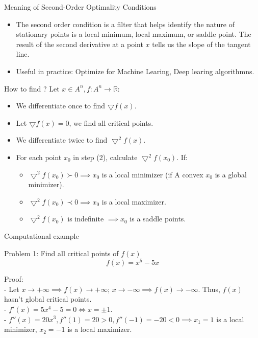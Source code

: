     \begin{frame}{Meaning of Second-Order Optimality Conditions}
    \begin{itemize}
        \item The second order condition is a filter that helps identify the nature of stationary points is a local minimum, local maximum, or saddle point. The result of the second derivative at a point $x$ tells us the slope of the tangent line.
        \item Useful in practice: Optimize for Machine Learing, Deep learing algorithmns.
    \end{itemize}
    \end{frame}

    \begin{frame}{How to find ?}
        Let $x \in A^n, f: A^n \rightarrow \mathbb{R}$:
        \begin{itemize}
            \item We differentiate once to find $\bigtriangledown f(x)$.
            \item Let $\bigtriangledown f(x) = 0$, we find all critical points.
            \item  We differentiate twice to find $\bigtriangledown ^2 f(x)$.
            \item For each point $x_0$ in step (2), calculate $\bigtriangledown ^2 f(x_0)$. If:
            \begin{itemize}
                \item $\bigtriangledown ^2 f(x_0) \succ 0 \implies x_0$ is a local minimizer (if A convex $x_0$ is a global minimizer).
                \item $\bigtriangledown ^2 f(x_0) \prec 0 \implies x_0$ is a local maximizer.
                \item $\bigtriangledown ^2 f(x_0)$ is indefinite $\implies x_0$ is a saddle points.
            \end{itemize}
        \end{itemize}
    \end{frame}

    \begin{frame}{Computational example}
        \begin{block}{Problem 1: Find all critical points of $f(x)$}
            \begin{equation}
                f(x) = x^5 - 5x
            \end{equation}
        \end{block}
        Proof: \\
        - Let $x \rightarrow +\infty \implies f(x) \rightarrow +\infty$; $x \rightarrow -\infty \implies f(x) \rightarrow -\infty$. Thus, $f(x)$ hasn't global critical points. \\
        - $f'(x) = 5x^4 -5 = 0 \Leftrightarrow x = \pm 1.$ \\
        - $f''(x) = 20x^3, f''(1) = 20 > 0, f''(-1) = -20 < 0 \implies x_1=1 $ is a local minimizer, $x_2=-1$ is a local maximizer.
    \end{frame}
    
